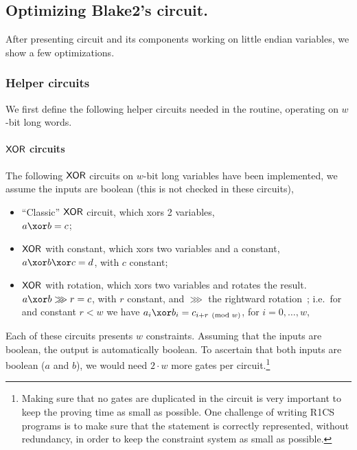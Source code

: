 \subsection{Optimizing Blake2's circuit.}\label{implementation:efficiency:blake}

After presenting  circuit and its components working on little endian variables, we show a few optimizations.

\subsubsection{Helper circuits}\label{implementation:efficiency:blake:helper-circuits}
We first define the following helper circuits needed in the  routine, operating on $w$-bit long words.

\paragraph{$\mathsf{XOR}$ circuits}

The following $\mathsf{XOR}$ circuits on $w$-bit long variables have been implemented, we assume the inputs are boolean (this is not checked in these circuits),
\begin{itemize}
  \item ``Classic'' $\mathsf{XOR}$ circuit, which xors 2 variables,\\ $a \xor b = c$;
  \item $\mathsf{XOR}$ with constant, which xors two variables and a constant,\\ $a \xor b \xor c = d$, with $c$ constant;
  \item $\mathsf{XOR}$ with rotation, which xors two variables and rotates the result.\\
  $a \xor b \ggg r = c$, with $r$ constant, and $\ggg$ the rightward rotation~\cite[Section 2.3]{blakecompietf};
  i.e.~for and constant $r < w$ we have $a_i \xor b_i = c_{i+r \pmod w}$, for $i = 0, \ldots, w$,
\end{itemize}

Each of these circuits presents $w$ constraints. Assuming that the inputs are boolean, the output is automatically boolean. To ascertain that both inputs are boolean ($a$ and $b$), we would need $2\cdot w$ more gates per circuit.\footnote{Making sure that no gates are duplicated in the circuit is very important to keep the proving time as small as possible. One challenge of writing R1CS programs is to make sure that the statement is correctly represented, without redundancy, in order to keep the constraint system as small as possible.}


